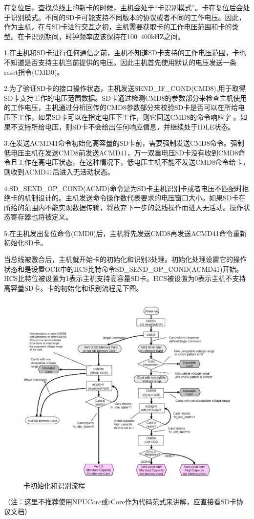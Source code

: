 在复位后，查找总线上的新卡的时候，主机会处于“卡识别模式”。卡在复位后会处于识别模式。不同的SD卡可能支持不同版本的协议或者不同的⼯作电压。因此，作为主机，在与SD卡进行交互之初，主机需要获取卡的工作电压范围和卡的类型。在卡识别期间，时钟频率应该保持在100~400kHZ之间。

1.在主机和SD卡进行任何通信之前，主机不知道SD卡支持的工作电压范围，卡也不知道是否支持主机当前提供的电压。因此主机首先使用默认的电压发送一条reset指令(CMD0)。

2.为了验证SD卡的接口操作状态，主机发送SEND_IF_COND(CMD8),用于取得SD卡支持工作的电压范围数据。SD卡通过检测CMD8的参数部分来检查主机使用的工作电压，主机通过分析回传的CMD8参数部分来校验SD卡是否可以在所给电压下工作，如果SD卡可以在指定电压下工作，则它回送CMD8的命令响应字 。如果不支持所给电压，则SD卡不会给出任何响应信息，并继续处于IDLE状态。

3.在发送ACMD41命令初始化高容量的SD卡前，需要强制发送CMD8命令。强制低电压主机在发送CMD8前发送ACMD41，万一双重电压SD卡没有收到CMD8命令且工作在高电压状态，在这种情况下，低电压主机不能不发送CMD8命令给卡，则收到ACMD41后进入无活动状态。

4.SD_SEND_OP_COND(ACMD)命令是为SD卡主机识别卡或者电压不匹配时拒绝卡的机制设计的。主机发送命令操作数代表要求的电压窗口大小。如果SD卡在所给的范围内不能实现数据传输，将放弃下一步的总线操作而进入无活动。操作状态寄存器也将被定义。

5.在主机发出复位命令(CMD0)后，主机将先发送CMD8再发送ACMD41命令重新初始化SD卡。

当总线被激合后，主机就开始卡的初始化和识别3处理。初始化处理设置它的操作状态和是设置OCR中的HCS比特命令SD_SEND_OP_COND(ACMD41)开始。HCS比特位被设置为1表示主机支持高容量SD卡。HCS被设置为0表示主机不支持高容量SD卡。卡的初始化和识别流程见下图。
\begin{figure}[H]
    \centering
    \includegraphics{figures/06-02-初始化.png}
    \caption{卡初始化和识别流程}
\end{figure}
（注：这里不推荐使用NPUCore或rCore作为代码范式来讲解，应直接看SD卡协议文档）


